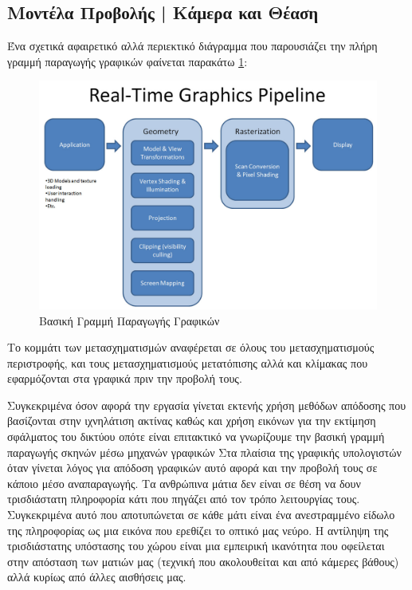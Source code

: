 \begin{appendices}
    \subsection*{Μοντέλα Προβολής | Κάμερα και Θέαση}
    \label{appendix:camerasystem}
    \par
       Ένα σχετικά αφαιρετικό αλλά περιεκτικό διάγραμμα που παρουσιάζει την πλήρη γραμμή παραγωγής γραφικών φαίνεται παρακάτω \ref{fig:graphicsenginepipeline}:
        \begin{figure}[H]
        \centering
        \includegraphics[width =.7\linewidth]{images/chapter2_img/pipeline.jpg}
        \caption{Βασική Γραμμή Παραγωγής Γραφικών }
        \label{fig:graphicsenginepipeline}
        \end{figure}
    Το κομμάτι των μετασχηματισμών αναφέρεται σε όλους του μετασχηματισμούς περιστροφής, και τους μετασχηματισμούς μετατόπισης αλλά και κλίμακας που εφαρμόζονται στα γραφικά πριν την προβολή τους.\\
    \par
        Συγκεκριμένα όσον αφορά την εργασία γίνεται εκτενής χρήση μεθόδων απόδοσης που βασίζονται στην ιχνηλάτιση ακτίνας καθώς και χρήση εικόνων για την εκτίμηση σφάλματος του δικτύου οπότε είναι επιτακτικό να γνωρίζουμε την βασική γραμμή παραγωγής σκηνών μέσω μηχανών γραφικών
        Στα πλαίσια της γραφικής υπολογιστών όταν γίνεται λόγος για απόδοση γραφικών αυτό αφορά και την προβολή τους σε κάποιο μέσο αναπαραγωγής. Τα ανθρώπινα μάτια δεν είναι σε θέση να δουν τρισδιάστατη πληροφορία κάτι που πηγάζει από τον τρόπο λειτουργίας τους. Συγκεκριμένα αυτό που αποτυπώνεται σε κάθε μάτι είναι ένα ανεστραμμένο είδωλο της  πληροφορίας ως μια εικόνα που ερεθίζει το οπτικό μας νεύρο. Η αντίληψη της τρισδιάστατης υπόστασης του χώρου είναι μια εμπειρική ικανότητα που οφείλεται στην απόσταση των ματιών μας (τεχνική που ακολουθείται και από κάμερες βάθους) αλλά κυρίως από άλλες αισθήσεις μας. 
    \begin{figure}[!tbh]

\end{figure}
\end{appendices}
